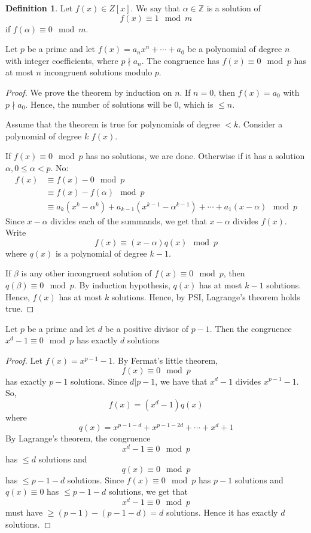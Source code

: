 \documentclass[12pt,letterpaper]{book}
\theoremstyle{definition}
\newtheorem{definition}{Definition} %
\newcommand{\Z}{\mathbb{Z}}
\begin{document}
\begin{definition}
  Let $f(x)  \in Z[x]$. We say that $\alpha \in \Z$ is a solution of 
  \[f(x) \equiv 1 \mod m\]
  if $f(\alpha) \equiv 0 \mod m$.
\end{definition}

\begin{theorem}
  Let $p$ be a prime and let $f(x) = a_nx^n + \cdots + a_0$ be a polynomial of degree $n$ with integer coefficients, where $p \nmid a_n$. The congruence has $f(x) \equiv 0 \mod p$ has at most $n$ incongruent solutions modulo $p$.
\end{theorem}
\begin{proof}
  We prove the theorem by induction on $n$. If $n=0$, then $f(x) = a_0$ with $p \nmid a_0$. Hence, the number of solutions will be 0, which is $\leq n$.

  Assume that the theorem is true for polynomials of degree $<k$. Consider a polynomial of degree $k$ $f(x)$.
  
  If $f(x) \equiv 0 \mod p$ has no solutions, we are done. Otherwise if it has a solution $\alpha, 0 \leq \alpha < p$. No:
  \begin{align*}
    f(x) &\equiv f(x) - 0 \mod p \\
         &\equiv f(x) - f(\alpha) \mod p\\
         &\equiv a_k(x^k - \alpha^k)+ a_{k-1} (x^{k-1} - \alpha^{k-1}) + \cdots + a_1(x - \alpha) \mod p
  \end{align*}
  Since $x-\alpha$ divides each of the summands, we get that $x-\alpha$ divides $f(x)$. Write
  \[f(x) \equiv (x-\alpha)q(x) \mod p\]
  where $q(x)$ is a polynomial of degree $k-1$.

  If $\beta$ is any other incongruent solution of $f(x) \equiv 0 \mod p$, then $q(\beta) \equiv 0 \mod p$. By induction hypothesis, $q(x)$ has at most $k-1$ solutions. Hence, $f(x)$ has at most $k$ solutions. Hence, by PSI, Lagrange's theorem holds true.
\end{proof}

\begin{corollary}
  Let $p$ be a prime and let $d$ be a positive divisor of $p-1$. Then the congruence $x^d-1 \equiv 0 \mod p$ has exactly $d$ solutions
\end{corollary}
\begin{proof}
  Let $f(x) = x^{p-1} -1$. By Fermat's little theorem,
  \[f(x) \equiv 0 \mod p\]
  has exactly $p-1$ solutions. Since $d|p-1$, we have that $x^d-1$ divides $x^{p-1}-1$. So,
  \[f(x) = (x^d-1)q(x)\]
  where
  \[q(x) = x^{p-1-d} + x^{p-1-2d} + \cdots + x^d + 1\]
  By Lagrange's theorem, the congruence
  \[x^d-1 \equiv 0 \mod p\]
  has $\leq d$ solutions and 
  \[q(x) \equiv 0 \mod p\]
  has $\leq p-1-d$ solutions. Since $f(x) \equiv 0 \mod p$ has $p-1$ solutions and $q(x) \equiv 0$ has $\leq p-1-d$ solutions, we get that
  \[x^d-1 \equiv 0 \mod p\]
  must have $\geq (p-1) - (p-1-d) = d$ solutions. Hence it has exactly $d$ solutions.
\end{proof}
\end{document}
